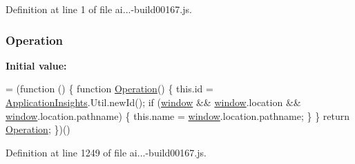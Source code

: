 Definition at line 1 of file ai...-\/build00167.\+js.

\subsubsection[{\texorpdfstring{Operation}{Operation}}]{ Operation}\hypertarget{_scripts_2ai_80_822_89-build00167_8js_a53ec7a54b2849bab2d97eca342a7bb17}{}\label{_scripts_2ai_80_822_89-build00167_8js_a53ec7a54b2849bab2d97eca342a7bb17}
{\bfseries Initial value\+:}
\begin{DoxyCode}
= (\textcolor{keyword}{function} () \{
                \textcolor{keyword}{function} \hyperlink{obj_2_release_2_package_2_package_tmp_2_scripts_2ai_80_822_89-build00167_8js_a53ec7a54b2849bab2d97eca342a7bb17}{Operation}() \{
                    this.\textcolor{keywordtype}{id} = \hyperlink{obj_2_release_2_package_2_package_tmp_2_scripts_2ai_80_822_89-build00167_8js_aa415ef4f8cdd699689ef4b61db7656d8}{ApplicationInsights}.Util.newId();
                    \textcolor{keywordflow}{if} (\hyperlink{obj_2_release_2_package_2_package_tmp_2_scripts_2jquery-1_810_82_8js_a04a8a2bbfa9c15500892b8e5033d625b}{window} && \hyperlink{obj_2_release_2_package_2_package_tmp_2_scripts_2jquery-1_810_82_8js_a04a8a2bbfa9c15500892b8e5033d625b}{window}.location && \hyperlink{obj_2_release_2_package_2_package_tmp_2_scripts_2jquery-1_810_82_8js_a04a8a2bbfa9c15500892b8e5033d625b}{window}.location.pathname) \{
                        this.name = \hyperlink{obj_2_release_2_package_2_package_tmp_2_scripts_2jquery-1_810_82_8js_a04a8a2bbfa9c15500892b8e5033d625b}{window}.location.pathname;
                    \}
                \}
                \textcolor{keywordflow}{return} \hyperlink{obj_2_release_2_package_2_package_tmp_2_scripts_2ai_80_822_89-build00167_8js_a53ec7a54b2849bab2d97eca342a7bb17}{Operation};
            \})()
\end{DoxyCode}


Definition at line 1249 of file ai...-\/build00167.\+js.

